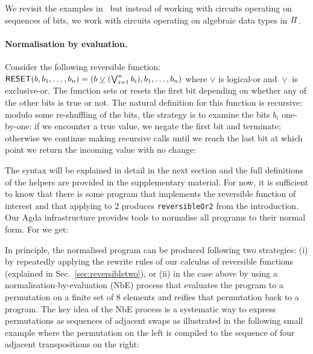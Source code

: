 We revisit the examples in~ but instead of working with circuits operating on sequences of bits, we
work with circuits operating on algebraic data types in $\mathit{\Pi}$.

\paragraph*{Normalisation by evaluation.} Consider the following reversible function: $\Afun{RESET}(b,b_1,\ldots,b_n) =
(b \; \underline{\vee} \; (\bigvee_{i=1}^n b_i),b_1,\ldots,b_n)$ where $\vee$ is logical-or and $\underline{\vee}$ is
exclusive-or. The function sets or resets the first bit depending on whether any of the other bits is true or not. The
natural definition for this function is recursive: modulo some re-shuffling of the bits, the strategy is to examine the
bits $b_i$ one-by-one: if we encounter a true value, we negate the first bit and terminate; otherwise we continue making
recursive calls until we reach the last bit at which point we return the incoming value with no change:


\resettwo{}

\noindent The syntax will be explained in detail in the next section and the full definitions of the helpers are
provided in the supplementary material. For now, it is sufficient to know that there is some program that implements the
reversible function of interest and that applying  to 2 produces \verb|reversibleOr2| from the introduction.
Our Agda infrastructure provides tools to normalise all programs to their normal form. For  we get:

\resetnormtwo{}

In principle, the normalised program can be produced following two strategies: (i) by repeatedly applying the rewrite
rules of our calculus of reversible functions (explained in Sec.~\ref{sec:reversibletwo}), or (ii) in the case above by
using a normalisation-by-evaluation (NbE) process that evaluates the program to a permutation on a finite set of 8
elements and reifies that permutation back to a program. The key idea of the NbE process is a systematic way to express
permutations as sequences of adjacent swaps as illustrated in the following small example where the permutation on the
left is compiled to the sequence of four adjacent transpositions on the right:

